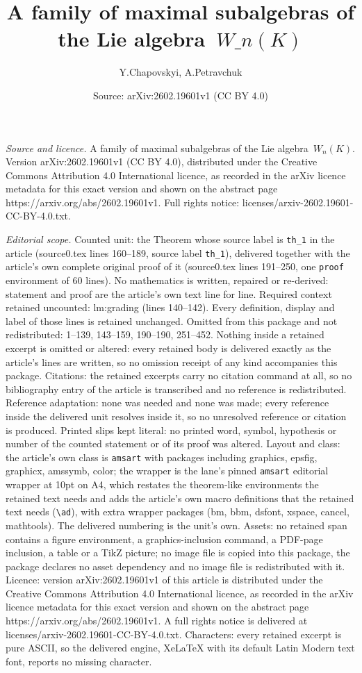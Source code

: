 \documentclass[10pt,a4paper]{amsart}
\title[A family of maximal subalgebras of the Lie algebra~$W\_n(K)$]{A family of maximal subalgebras of the Lie algebra~$W\_n(K)$}
\author{Y.Chapovskyi, A.Petravchuk}
\date{Source: arXiv:2602.19601v1 (CC BY 4.0)}
\begin{document}
\maketitle

\noindent\emph{Source and licence.} A family of maximal subalgebras of the Lie algebra~$W_n(K)$. Version arXiv:2602.19601v1 (CC BY 4.0), distributed under the Creative Commons Attribution 4.0 International licence, as recorded in the arXiv licence metadata for this exact version and shown on the abstract page https://arxiv.org/abs/2602.19601v1. Full rights notice: licenses/arxiv-2602.19601-CC-BY-4.0.txt.\par\smallskip

\noindent\textit{Editorial scope.} Counted unit: the Theorem whose source label is \texttt{th\_1} in the article (source0.tex lines 160--189, source label \texttt{th\_1}), delivered together with the article's own complete original proof of it (source0.tex lines 191--250, one \texttt{proof} environment of 60 lines). No mathematics is written, repaired or re-derived: statement and proof are the article's own text line for line. Required context retained uncounted: lm:grading (lines 140--142). Every definition, display and label of those lines is retained unchanged. Omitted from this package and not redistributed: 1--139, 143--159, 190--190, 251--452. Nothing inside a retained excerpt is omitted or altered: every retained body is delivered exactly as the article's lines are written, so no omission receipt of any kind accompanies this package. Citations: the retained excerpts carry no citation command at all, so no bibliography entry of the article is transcribed and no reference is redistributed. Reference adaptation: none was needed and none was made; every reference inside the delivered unit resolves inside it, so no unresolved reference or citation is produced. Printed slips kept literal: no printed word, symbol, hypothesis or number of the counted statement or of its proof was altered. Layout and class: the article's own class is \texttt{amsart} with packages including graphics, epsfig, graphicx, amssymb, color; the wrapper is the lane's pinned \texttt{amsart} editorial wrapper at 10pt on A4, which restates the theorem-like environments the retained text needs and adds the article's own macro definitions that the retained text needs (\texttt{\textbackslash ad}), with extra wrapper packages (bm, bbm, dsfont, xspace, cancel, mathtools). The delivered numbering is the unit's own. Assets: no retained span contains a figure environment, a graphics-inclusion command, a PDF-page inclusion, a table or a TikZ picture; no image file is copied into this package, the package declares no asset dependency and no image file is redistributed with it. Licence: version arXiv:2602.19601v1 of this article is distributed under the Creative Commons Attribution 4.0 International licence, as recorded in the arXiv licence metadata for this exact version and shown on the abstract page https://arxiv.org/abs/2602.19601v1. A full rights notice is delivered at licenses/arxiv-2602.19601-CC-BY-4.0.txt. Characters: every retained excerpt is pure ASCII, so the delivered engine, XeLaTeX with its default Latin Modern text font, reports no missing character.
\end{document}
